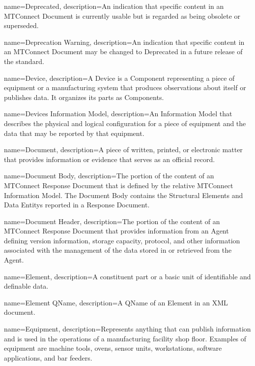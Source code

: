 {
    name={Deprecated},
	description={An indication that specific content in an \gls{MTConnect Document} is currently usable but is regarded as being obsolete or superseded. }
}

{
    name={Deprecation Warning},
	description={An indication that specific content in an \gls{MTConnect Document} may be changed to \gls{Deprecated} in a future release of the standard.}
}

{
    name={Device},
	description={A \gls{Device} is a \gls{Component} representing a piece of equipment or a manufacturing system that produces observations about itself or publishes data. It organizes its parts as \glspl{Component}.}
}

{
    name={Devices Information Model},
	description={An \gls{Information Model} that describes the physical and logical configuration for a piece of equipment and the data that may be reported by that equipment. }
}

{
    name={Document},
	description={A piece of written, printed, or electronic matter that provides information or evidence that serves as an official record.}
}

{
    name={Document Body},
	description={The portion of the content of an \gls{MTConnect Response Document} that is defined by the relative \gls{MTConnect Information Model}. The \gls{Document Body} contains the \glspl{Structural Element} and \glspl{Data Entity} reported in a \gls{Response Document}.
}
}

{
    name={Document Header},
	description={The portion of the content of an \gls{MTConnect Response Document} that provides information from an \gls{Agent} defining version information, storage capacity, protocol, and other information associated with the management of the data stored in or retrieved from the \gls{Agent}.
}
}

{
    name={Element},
	description={A constituent part or a basic unit of identifiable and definable data.}
}

{
    name={Element QName},
	description={A \gls{QName} of an \gls{Element} in an XML document.}
}

{
    name={Equipment},
	description={Represents anything that can publish information and is used in the operations of a manufacturing facility shop floor.  Examples of equipment are machine tools, ovens, sensor units, workstations, software applications, and bar feeders.}
}

